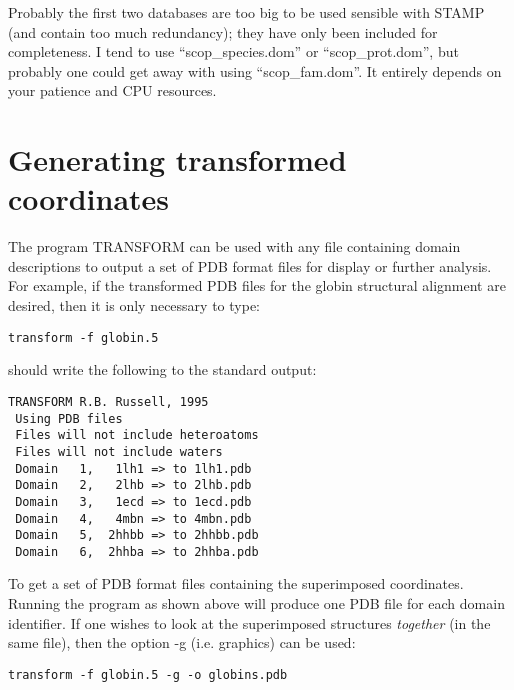 Probably the first two databases are too big to be used sensible with STAMP (and contain
too much redundancy); they have only been included for completeness.  I tend to
use ``scop\_species.dom'' or ``scop\_prot.dom'', but probably one could get away with
using ``scop\_fam.dom''.  It entirely depends on your patience and CPU resources.

\section{Generating transformed coordinates}

The program TRANSFORM can be used with any file containing domain
descriptions to output a set of PDB format files for display or
further analysis.  For example, if the transformed PDB files for
the globin structural alignment are desired, then it is only necessary to type:\\

\begin{scriptsize}\begin{verbatim}
transform -f globin.5
\end{verbatim} \end{scriptsize}

should write the following to the standard output:\\

\begin{scriptsize}\begin{verbatim}
TRANSFORM R.B. Russell, 1995
 Using PDB files
 Files will not include heteroatoms
 Files will not include waters
 Domain   1,   1lh1 => to 1lh1.pdb
 Domain   2,   2lhb => to 2lhb.pdb
 Domain   3,   1ecd => to 1ecd.pdb
 Domain   4,   4mbn => to 4mbn.pdb
 Domain   5,  2hhbb => to 2hhbb.pdb
 Domain   6,  2hhba => to 2hhba.pdb
\end{verbatim} \end{scriptsize}

To get a set of PDB format files containing the superimposed
coordinates.  Running the program as shown above will produce one PDB 
file for each domain identifier.  If one wishes to look at the 
superimposed structures {\em together} (in the same file), then the 
option -g (i.e. graphics) can be used:\\

\begin{scriptsize}\begin{verbatim}
transform -f globin.5 -g -o globins.pdb
\end{verbatim} \end{scriptsize}

